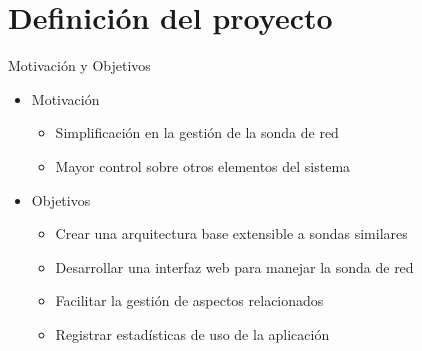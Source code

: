 \section{Definición del proyecto}

\begin{frame}{Motivación y Objetivos}
  \begin{itemize}
    \item\alert<+>{Motivación}
    \begin{itemize}
      \item Simplificación en la gestión de la sonda de red
      \item Mayor control sobre otros elementos del sistema
    \end{itemize}
    \item\alert<+>{Objetivos}
    \begin{itemize}
      \item Crear una arquitectura base extensible a sondas similares
      \item Desarrollar una interfaz web para manejar la sonda de red
      \item Facilitar la gestión de aspectos relacionados
      \item Registrar estadísticas de uso de la aplicación
    \end{itemize}
  \end{itemize}
\end{frame}
